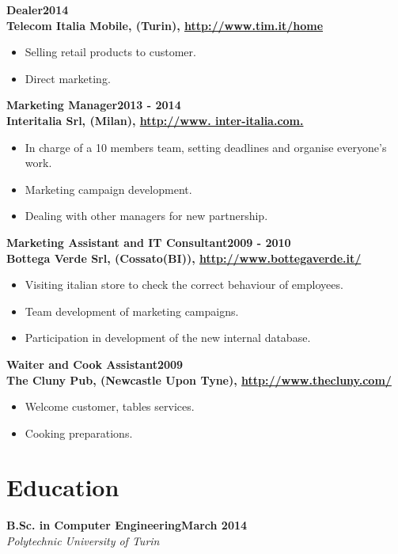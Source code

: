 \documentclass[a4paper,sans,10pt]{moderncv} %
\newcommand{\education}{Education}
\begin{document}
\vspace{0.5em}
  \textbf{Dealer}\hfill\textbf{2014}\\
  \textbf{Telecom Italia Mobile, (Turin), \url{http://www.tim.it/home}}\\
\vspace{-1em}
  \begin{itemize}
  \item Selling retail products to customer. 
  \item Direct marketing.
  \end{itemize}
  
  \vspace{0.5em}
  \textbf{Marketing Manager}\hfill\textbf{2013 - 2014}\\
  \textbf{Interitalia Srl, (Milan), \url{http://www. inter-italia.com.}}\\
\vspace{-1em}
  \begin{itemize}
  \item In charge of a 10 members team, setting deadlines and organise everyone's work.
  \item Marketing campaign development.
  \item Dealing with other managers for new partnership.
  \end{itemize}
  
\vspace{0.5em}
  \textbf{Marketing Assistant and IT Consultant}\hfill\textbf{2009 - 2010}\\
  \textbf{Bottega Verde Srl, (Cossato(BI)), \url{http://www.bottegaverde.it/}}\\
\vspace{-1em}
  \begin{itemize}
  \item Visiting italian store to check the correct behaviour of employees. 
  \item Team development of marketing campaigns.
  \item Participation in development of the new internal database.
  \end{itemize}  
  
\vspace{0.5em}
  \textbf{Waiter and Cook Assistant}\hfill\textbf{2009}\\
  \textbf{The Cluny Pub, (Newcastle Upon Tyne), \url{http://www.thecluny.com/}}\\
\vspace{-1em}
  \begin{itemize}
  \item Welcome customer, tables services. 
  \item Cooking preparations.
  \end{itemize} 

\section{\education}

  \textbf{B.Sc. in  Computer Engineering}\hfill\textbf{March 2014}\\
  \textit{Polytechnic University of Turin}
\end{document}
